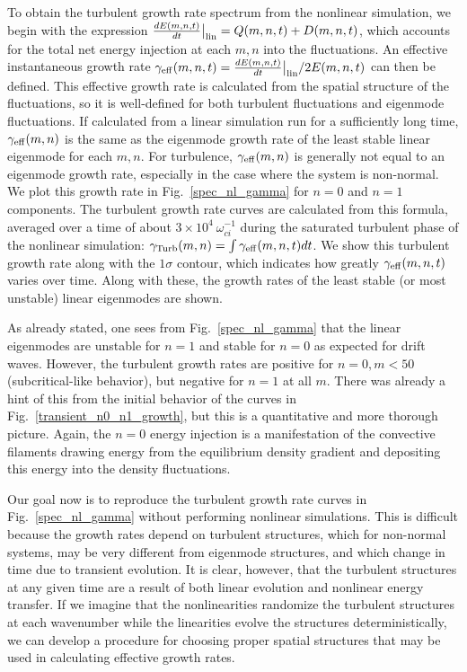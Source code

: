 \documentclass[showpacs,preprintnumbers,amsmath,amssymb,superscriptaddress,aip]{revtex4-1}
\newcommand{\diff}[2]{\frac{d#1}{d#2}}
\begin{document}
To obtain the turbulent growth rate spectrum from the nonlinear simulation, we begin with the expression $\diff{E(m,n,t)}{t}\big|_{\rm{lin}} = Q(m,n,t) + D(m,n,t)$, 
which accounts for the total net energy injection at each $m,n$ into the fluctuations. 
An effective instantaneous growth rate $\gamma_{\rm{eff}}(m,n,t) = \diff{E(m,n,t)}{t}\big|_{\rm{lin}}/ 2 E(m,n,t)$ can then be defined. 
This effective growth rate is calculated from the spatial structure of the fluctuations, so it is well-defined for both turbulent fluctuations and eigenmode fluctuations. If calculated
from a linear simulation run for a sufficiently long time, $\gamma_{\rm{eff}}(m,n)$ is the same as the eigenmode growth rate of the least stable linear eigenmode for each $m,n$.
For turbulence, $\gamma_{\rm{eff}}(m,n)$ is generally not equal to an eigenmode growth rate, especially in the case where the system is non-normal.
We plot this growth rate in Fig.~\ref{spec_nl_gamma} for $n=0$ and $n=1$ components. The turbulent growth rate curves are calculated from this formula, 
averaged over a time of about $3 \times 10^{4} \ \omega_{ci}^{-1}$ during the saturated turbulent phase of the nonlinear simulation: $\gamma_{\rm{Turb}}(m,n) = \int \gamma_{\rm{eff}}(m,n,t) dt$. 
We show this turbulent growth rate along with the $1 \sigma$ contour, which indicates how greatly $\gamma_{\rm{eff}}(m,n,t)$ varies over time.
Along with these, the growth rates of the least stable (or most unstable) linear eigenmodes are shown.

As already stated, one sees from Fig.~\ref{spec_nl_gamma} that the linear eigenmodes are unstable for $n=1$ and stable for $n=0$ as expected for drift waves. 
However, the turbulent growth rates are positive for $n=0, m<50$ (subcritical-like behavior), but negative for $n=1$ at all $m$. 
There was already a hint of this from the initial behavior of the curves in Fig.~\ref{transient_n0_n1_growth}, but this is a quantitative and more thorough picture.
Again, the $n=0$ energy injection is a manifestation of the convective filaments drawing energy from the equilibrium density gradient and depositing this energy into the density fluctuations.

Our goal now is to reproduce the turbulent growth rate curves in Fig.~\ref{spec_nl_gamma} without performing nonlinear simulations. This is difficult because the growth rates depend on turbulent
structures, which for non-normal systems, may be very different from eigenmode structures, and which change in time due to transient evolution.
It is clear, however, that the turbulent structures at any given time are a result of both linear evolution and nonlinear energy transfer. 
If we imagine that the nonlinearities randomize the turbulent structures at each wavenumber while the linearities evolve the structures
deterministically, we can develop a procedure for choosing proper spatial structures that may be used in calculating effective growth rates.
\end{document}
